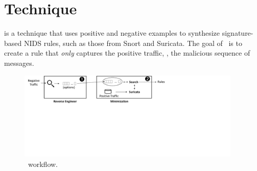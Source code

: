 \documentclass[runningheads]{llncs}
\begin{document}



\section{Technique}

\tname{} is a technique that uses positive and negative examples to
synthesize signature-based NIDS rules, such as those from Snort and
Suricata. The goal of \tname\ is to create a rule that \emph{only}
captures the positive traffic, \ie{}, the malicious sequence of
messages.

\begin{figure}[t]
\centering
\includegraphics[trim=0 300 350 0,clip,width=0.95\textwidth]{figs/nids-workflow}
\caption{\tname\ workflow.}
\label{fig:overview}
\end{figure}
\end{document}
